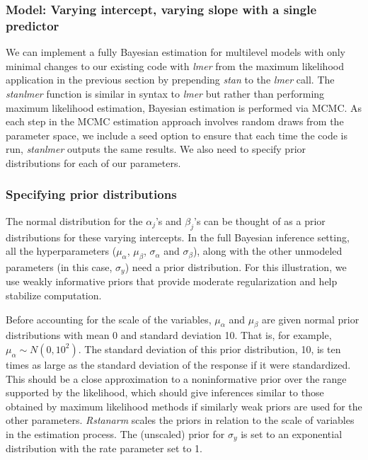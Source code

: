 \subsubsection*{Model: Varying intercept, varying slope with a single predictor}

We can implement a fully Bayesian estimation for multilevel models with only minimal changes to our existing code with \textit{lmer} from the maximum likelihood application in the previous section by prepending \textit{stan\textunderscore} to the \textit{lmer} call. The \textit{stan\textunderscore lmer} function is similar in syntax to \textit{lmer} but rather than performing maximum likelihood estimation, Bayesian estimation is performed via MCMC. As each step in the MCMC estimation approach involves random draws from the parameter space, we include a seed option to ensure that each time the code is run, \textit{stan\textunderscore lmer} outputs the same results. We also need to specify prior distributions for each of our parameters.

\subsubsection*{Specifying prior distributions}
\label{subsection:prior}
The normal distribution for the $\alpha_{j}$'s and $\beta_{j}$'s can be thought of as a prior distributions for these varying intercepts. In the full Bayesian inference setting, all the hyperparameters ($\mu_{\alpha}$, $\mu_{\beta}$, $\sigma_{\alpha}$ and $\sigma_{\beta}$), along with the other unmodeled parameters (in this case, $\sigma_{y}$) need a prior distribution. For this illustration, we use weakly informative priors that provide moderate regularization and help stabilize computation.

Before accounting for the scale of the variables, $\mu_{\alpha}$ and $\mu_{\beta}$ are given normal prior distributions with mean 0 and standard deviation 10.  That is, for example, $\mu_{\alpha} \sim N(0, 10^2)$. The standard deviation of this prior distribution, 10, is ten times as large as the standard deviation of the response if it were standardized. This should be a close approximation to a noninformative prior over the range supported by the likelihood, which should give inferences similar to those obtained by maximum likelihood methods if similarly weak priors are used for the other parameters. \textit{Rstanarm} scales the priors in relation to the scale of variables in the estimation process. The (unscaled) prior for $\sigma_{y}$ is set to an exponential distribution with the rate parameter set to 1.

